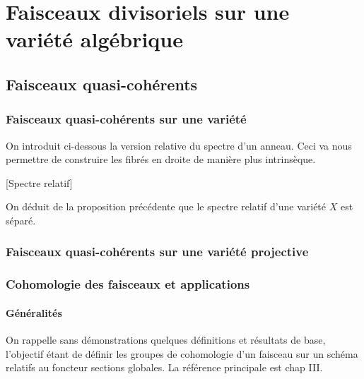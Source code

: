 \chapter{Faisceaux divisoriels sur une variété algébrique}


\section{Faisceaux quasi-cohérents}

\subsection{Faisceaux quasi-cohérents sur une variété}

On introduit ci-dessous la version relative du spectre d'un anneau. Ceci va nous permettre de construire les fibrés en droite de manière plus intrinsèque.

\begin{cons}\label{relspec}[Spectre relatif]

\end{cons}

On déduit de la proposition précédente que le spectre relatif d'une variété $X$ est séparé.

\subsection{Faisceaux quasi-cohérents sur une variété projective}

\subsection{Cohomologie des faisceaux et applications}

\subsubsection{Généralités}

\noindent On rappelle sans démonstrations quelques définitions et résultats de base, l'objectif étant de définir les groupes de cohomologie d'un faisceau sur un schéma relatifs au foncteur sections globales. La référence principale est \cite{Hartshorne} chap III.\\

